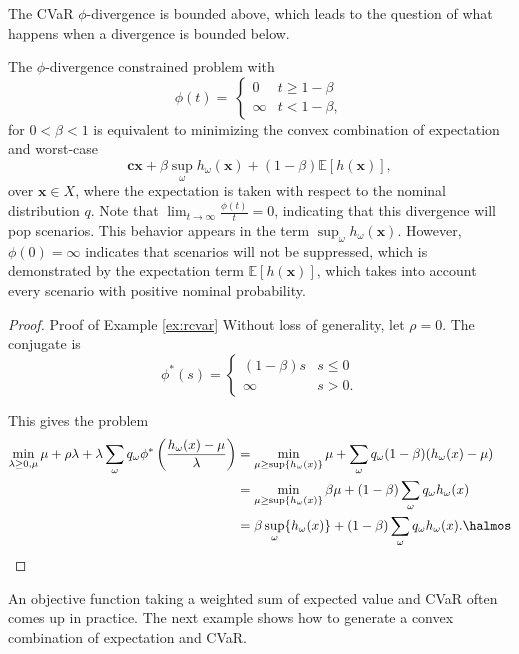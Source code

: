 \documentclass[12pt]{article}
\newcommand{\E}{\mathbb{E}}
\newcommand{\e}[1]{\E \left[ #1 \right]}
\newcommand{\x}{\mathbf{x}}
\renewcommand{\c}{\mathbf{c}}
\theoremstyle{plain}
\theoremstyle{definition}
\theoremstyle{remark}
\begin{document}
The CVaR $\phi$-divergence is bounded above, which leads to the question of what happens when a divergence is bounded below.
\begin{example}
	\label{ex:rcvar}
	The $\phi$-divergence constrained problem with
	\[
		\phi(t) = \
		\begin{cases}
			0 & t \geq 1-\beta \\
			\infty & t < 1-\beta,
		\end{cases}
	\]
	for $0 < \beta < 1$ is equivalent to minimizing the convex combination of expectation and worst-case
	\[
		\c\x + \beta \sup_\omega h_\omega(\x) + (1-\beta)\e{h(\x)},
	\]
	over $\x \in X$, where the expectation is taken with respect to the nominal distribution $q$.
	Note that $\lim_{t \rightarrow \infty} \frac{\phi(t)}{t} = 0$, indicating that this divergence will pop scenarios.
	This behavior appears in the term $\sup_\omega h_\omega(\x)$.
	However, $\phi(0) = \infty$ indicates that scenarios will not be suppressed, which is demonstrated by the expectation term $\e{h(\x)}$, which takes into account every scenario with positive nominal probability.
\end{example}

\begin{proof}{\sc Proof of Example \ref{ex:rcvar}}
	Without loss of generality, let $\rho = 0$.
	The conjugate is
	\[
		\phi^*(s) =
		\begin{cases}
			(1-\beta) s & s \leq 0 \\
			\infty & s > 0.
		\end{cases}
	\]
	
	This gives the problem
	\begin{align*}
		\min_{\lambda \geq 0,\mu} \mu + \rho \lambda + \lambda \sum_\omega q_\omega \phi^*\left(\frac{h_\omega(x)-\mu}{\lambda}\right) & = \min_{\mu \geq \sup\{h_\omega(x)\}} \mu + \sum_\omega q_\omega (1-\beta) (h_\omega(x) - \mu) \\
		& = \min_{\mu \geq \sup\{h_\omega(x)\}} \beta \mu + (1-\beta) \sum_\omega q_\omega h_\omega(x) \\
		& = \beta \sup_\omega\{h_\omega(x)\} + (1-\beta) \sum_\omega q_\omega h_\omega(x). \halmos
	\end{align*}
\end{proof}

An objective function taking a weighted sum of expected value and CVaR often comes up in practice.
The next example shows how to generate a convex combination of expectation and CVaR.
\end{document}

